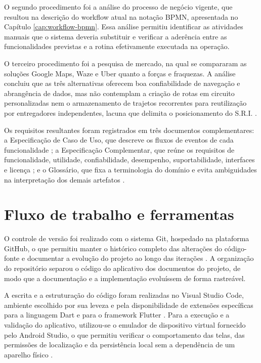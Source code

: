 O segundo procedimento foi a análise do processo de negócio vigente, que resultou na descrição do workflow atual na notação BPMN, apresentada no Capítulo \ref{cap:workflow-bpmn}. Essa análise permitiu identificar as atividades manuais que o sistema deveria substituir e verificar a aderência entre as funcionalidades previstas e a rotina efetivamente executada na operação.

O terceiro procedimento foi a pesquisa de mercado, na qual se compararam as soluções Google Maps, Waze e Uber quanto a forças e fraquezas. A análise concluiu que as três alternativas oferecem boa confiabilidade de navegação e abrangência de dados, mas não contemplam a criação de rotas em circuito personalizadas nem o armazenamento de trajetos recorrentes para reutilização por entregadores independentes, lacuna que delimita o posicionamento do S.R.I. \cite{sriVisao2025}.

Os requisitos resultantes foram registrados em três documentos complementares: a Especificação de Caso de Uso, que descreve os fluxos de eventos de cada funcionalidade \cite{sriEspecUC2026}; a Especificação Complementar, que reúne os requisitos de funcionalidade, utilidade, confiabilidade, desempenho, suportabilidade, interfaces e licença \cite{sriEspecComp2025}; e o Glossário, que fixa a terminologia do domínio e evita ambiguidades na interpretação dos demais artefatos \cite{sriGlossario2026}.

\section{Fluxo de trabalho e ferramentas}

O controle de versão foi realizado com o sistema Git, hospedado na plataforma GitHub, o que permitiu manter o histórico completo das alterações do código-fonte e documentar a evolução do projeto ao longo das iterações \cite{git2024, github2024}. A organização do repositório separou o código do aplicativo dos documentos do projeto, de modo que a documentação e a implementação evoluíssem de forma rastreável.

A escrita e a estruturação do código foram realizadas no Visual Studio Code, ambiente escolhido por sua leveza e pela disponibilidade de extensões específicas para a linguagem Dart e para o framework Flutter \cite{vscode2024}. Para a execução e a validação do aplicativo, utilizou-se o emulador de dispositivo virtual fornecido pelo Android Studio, o que permitiu verificar o comportamento das telas, das permissões de localização e da persistência local sem a dependência de um aparelho físico \cite{androidstudio2024}.

